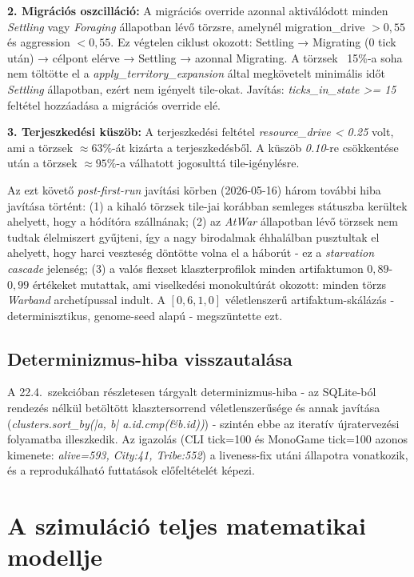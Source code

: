 \textbf{2. Migrációs oszcilláció:} A migrációs override azonnal aktiválódott minden \textit{Settling} vagy \textit{Foraging} állapotban lévő törzsre, amelynél migration\_drive $> 0{,}55$ és aggression $< 0{,}55$. Ez végtelen ciklust okozott: Settling → Migrating (0 tick után) → célpont elérve → Settling → azonnal Migrating. A törzsek ~15\%-a soha nem töltötte el a \textit{apply\_territory\_expansion} által megkövetelt minimális időt \textit{Settling} állapotban, ezért nem igényelt tile-okat. Javítás: \textit{ticks\_in\_state >= 15} feltétel hozzáadása a migrációs override elé.

\textbf{3. Terjeszkedési küszöb:} A terjeszkedési feltétel \textit{resource\_drive < 0.25} volt, ami a törzsek $\approx 63\%$-át kizárta a terjeszkedésből. A küszöb \textit{0.10}-re csökkentése után a törzsek $\approx 95\%$-a válhatott jogosulttá tile-igénylésre.

Az ezt követő \textit{post-first-run} javítási körben (2026-05-16) három további hiba javítása történt: (1) a kihaló törzsek tile-jai korábban semleges státuszba kerültek ahelyett, hogy a hódítóra szállnának; (2) az \textit{AtWar} állapotban lévő törzsek nem tudtak élelmiszert gyűjteni, így a nagy birodalmak éhhalálban pusztultak el ahelyett, hogy harci veszteség döntötte volna el a háborút - ez a \textit{starvation cascade} jelenség; (3) a valós flexset klaszterprofilok minden artifaktumon $0{,}89$-$0{,}99$ értékeket mutattak, ami viselkedési monokultúrát okozott: minden törzs \textit{Warband} archetípussal indult. A $[0{,}6, 1{,}0]$ véletlenszerű artifaktum-skálázás - determinisztikus, genome-seed alapú - megszüntette ezt.

\subsection*{Determinizmus-hiba visszautalása}

A 22.4.~szekcióban részletesen tárgyalt determinizmus-hiba - az SQLite-ból rendezés nélkül betöltött klasztersorrend véletlenszerűsége és annak javítása (\textit{clusters.sort\_by(|a, b| a.id.cmp(\&b.id))}) - szintén ebbe az iteratív újratervezési folyamatba illeszkedik. Az igazolás (CLI tick=100 és MonoGame tick=100 azonos kimenete: \textit{alive=593, City:41, Tribe:552}) a liveness-fix utáni állapotra vonatkozik, és a reprodukálható futtatások előfeltételét képezi.

\section{A szimuláció teljes matematikai modellje}
\label{sec:neurosim-26-mathmodel}

